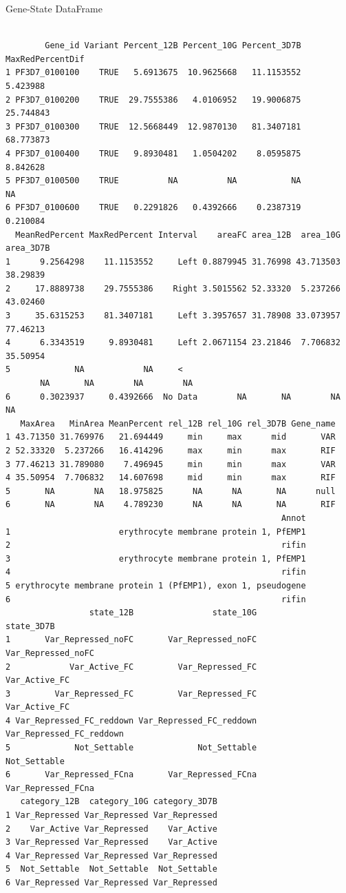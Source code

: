 \documentclass[11pt]{article}
\begin{document}
Gene-State DataFrame
\begin{verbatim}

        Gene_id Variant Percent_12B Percent_10G Percent_3D7B MaxRedPercentDif
1 PF3D7_0100100    TRUE   5.6913675  10.9625668   11.1153552         5.423988
2 PF3D7_0100200    TRUE  29.7555386   4.0106952   19.9006875        25.744843
3 PF3D7_0100300    TRUE  12.5668449  12.9870130   81.3407181        68.773873
4 PF3D7_0100400    TRUE   9.8930481   1.0504202    8.0595875         8.842628
5 PF3D7_0100500    TRUE          NA          NA           NA               NA
6 PF3D7_0100600    TRUE   0.2291826   0.4392666    0.2387319         0.210084
  MeanRedPercent MaxRedPercent Interval    areaFC area_12B  area_10G area_3D7B
1      9.2564298    11.1153552     Left 0.8879945 31.76998 43.713503  38.29839
2     17.8889738    29.7555386    Right 3.5015562 52.33320  5.237266  43.02460
3     35.6315253    81.3407181     Left 3.3957657 31.78908 33.073957  77.46213
4      6.3343519     9.8930481     Left 2.0671154 23.21846  7.706832  35.50954
5             NA            NA     <
       NA       NA        NA        NA
6      0.3023937     0.4392666  No Data        NA       NA        NA        NA
   MaxArea   MinArea MeanPercent rel_12B rel_10G rel_3D7B Gene_name
1 43.71350 31.769976   21.694449     min     max      mid       VAR
2 52.33320  5.237266   16.414296     max     min      max       RIF
3 77.46213 31.789080    7.496945     min     min      max       VAR
4 35.50954  7.706832   14.607698     mid     min      max       RIF
5       NA        NA   18.975825      NA      NA       NA      null
6       NA        NA    4.789230      NA      NA       NA       RIF
                                                        Annot
1                      erythrocyte membrane protein 1, PfEMP1
2                                                       rifin
3                      erythrocyte membrane protein 1, PfEMP1
4                                                       rifin
5 erythrocyte membrane protein 1 (PfEMP1), exon 1, pseudogene
6                                                       rifin
                 state_12B                state_10G               state_3D7B
1       Var_Repressed_noFC       Var_Repressed_noFC       Var_Repressed_noFC
2            Var_Active_FC         Var_Repressed_FC            Var_Active_FC
3         Var_Repressed_FC         Var_Repressed_FC            Var_Active_FC
4 Var_Repressed_FC_reddown Var_Repressed_FC_reddown Var_Repressed_FC_reddown
5             Not_Settable             Not_Settable             Not_Settable
6       Var_Repressed_FCna       Var_Repressed_FCna       Var_Repressed_FCna
   category_12B  category_10G category_3D7B
1 Var_Repressed Var_Repressed Var_Repressed
2    Var_Active Var_Repressed    Var_Active
3 Var_Repressed Var_Repressed    Var_Active
4 Var_Repressed Var_Repressed Var_Repressed
5  Not_Settable  Not_Settable  Not_Settable
6 Var_Repressed Var_Repressed Var_Repressed
\end{verbatim}
\end{document}
